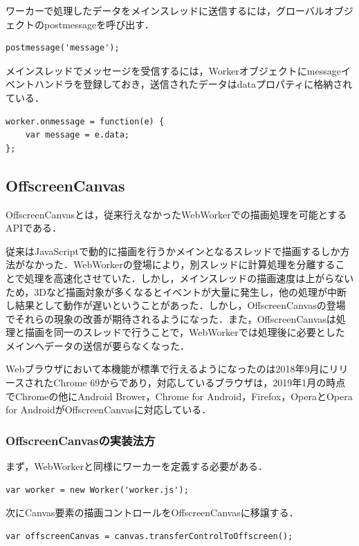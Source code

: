 \documentclass[a4j,12pt]{jsarticle}
\begin{document}
ワーカーで処理したデータをメインスレッドに送信するには，グローバルオブジェクトのpostmessageを呼び出す．
\begin{lstlisting}[basicstyle=\ttfamily\footnotesize, frame=single]
postmessage('message');
 \end{lstlisting}

メインスレッドでメッセージを受信するには，Workerオブジェクトにmessageイベントハンドラを登録しておき，送信されたデータはdataプロパティに格納されている．
\begin{lstlisting}[basicstyle=\ttfamily\footnotesize, frame=single]
worker.onmessage = function(e) {
	var message = e.data;
};
 \end{lstlisting}

\subsection{OffscreenCanvas}
OffscreenCanvasとは，従来行えなかったWebWorkerでの描画処理を可能とするAPIである．

従来はJavaScriptで動的に描画を行うかメインとなるスレッドで描画するしか方法がなかった．WebWorkerの登場により，別スレッドに計算処理を分離することで処理を高速化させていた．しかし，メインスレッドの描画速度は上がらないため，3Dなど描画対象が多くなるとイベントが大量に発生し，他の処理が中断し結果として動作が遅いということがあった．しかし，OffscreenCanvasの登場でそれらの現象の改善が期待されるようになった．また，OffscreenCanvasは処理と描画を同一のスレッドで行うことで，WebWorkerでは処理後に必要としたメインへデータの送信が要らなくなった．

Webブラウザにおいて本機能が標準で行えるようになったのは2018年9月にリリースされたChrome 69からであり，対応しているブラウザは，2019年1月の時点でChromeの他にAndroid Brower，Chrome for Android，Firefox，OperaとOpera for AndroidがOffscreenCanvasに対応している．

\subsubsection{OffscreenCanvasの実装法方}
まず，WebWorkerと同様にワーカーを定義する必要がある．
\begin{lstlisting}[basicstyle=\ttfamily\footnotesize, frame=single]
var worker = new Worker('worker.js');
 \end{lstlisting}
 
 次にCanvas要素の描画コントロールをOffscreenCanvasに移譲する．
 \begin{lstlisting}[basicstyle=\ttfamily\footnotesize, frame=single]
var offscreenCanvas = canvas.transferControlToOffscreen();
 \end{lstlisting}
 
\end{document}
